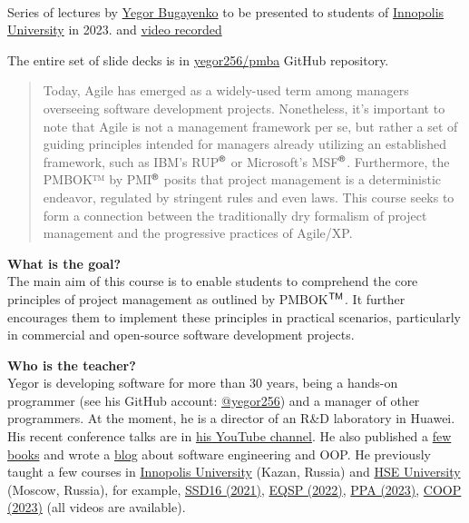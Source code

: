 \documentclass[nobrand,anonymous,nodate,nosecurity]{huawei}
\newcommand\REG{$^{\tiny{\textsf{\textregistered}}}$}
\newcommand\TM{$^{\tiny{\textsf{TM}}}$}
\begin{document}
{\\
Series of lectures by \href{https://www.yegor256.com}{Yegor Bugayenko} to be presented
to students of \href{https://innopolis.university/en/}{Innopolis University} in 2023.
and \href{https://www.youtube.com/playlist?list=PLaIsQH4uc08x_T-Aelduv3Zf0DWRx40pq}{video recorded}}

The entire set of slide decks is in \href{https://github.com/yegor256/pmba}{yegor256/pmba} GitHub repository.

\begin{abstract}
Today, Agile has emerged as a widely-used term among managers overseeing software development projects. Nonetheless, it's important to note that Agile is not a management framework per se, but rather a set of guiding principles intended for managers already utilizing an established framework, such as IBM's RUP\REG{} or Microsoft's MSF\REG{}. Furthermore, the PMBOK™ by PMI\REG{} posits that project management is a deterministic endeavor, regulated by stringent rules and even laws. This course seeks to form a connection between the traditionally dry formalism of project management and the progressive practices of Agile/XP.
\end{abstract}

\textbf{What is the goal?}\\
The main aim of this course is to enable students to comprehend the core principles of project management as outlined by PMBOK\TM{}. It further encourages them to implement these principles in practical scenarios, particularly in commercial and open-source software development projects.

\textbf{Who is the teacher?}\\
Yegor is developing software for more than 30 years, being a hands-on programmer
(see his GitHub account: \href{https://github.com/yegor256}{@yegor256})
and a manager of other programmers. At the moment, he is a director
of an R\&D laboratory in Huawei. His recent conference talks are in
\href{https://www.youtube.com/channel/UCr9qCdqXLm2SU0BIs6d_68Q}{his YouTube channel}.
He also published a \href{https://www.yegor256.com/books.html}{few books}
and wrote a \href{https://www.yegor256.com/contents.html}{blog} about software engineering
and OOP.
He previously taught a few courses in
\href{https://innopolis.university/}{Innopolis University} (Kazan, Russia)
and
\href{https://hse.ru}{HSE University} (Moscow, Russia),
for example,
\href{https://github.com/yegor256/ssd16}{SSD16 (2021)},
\href{https://github.com/yegor256/eqsp}{EQSP (2022)},
\href{https://github.com/yegor256/ppa}{PPA (2023)},
\href{https://github.com/yegor256/painofoop}{COOP (2023)}
(all videos are available).
\end{document}
